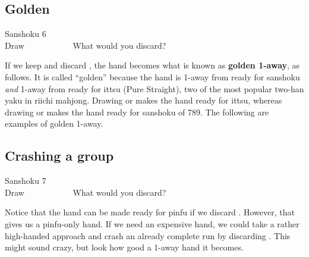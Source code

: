 \newpage
\subsection{Golden}\label{sec:san6}
\begin{itembox}[r]{{\jap Sanshoku} 6}
\bp
{}~\\
\hfill\footnotesize{Draw~~~~~~~~~~~}
\ep
\vspace{-17pt}What would you discard? \vspace{-5pt}
\end{itembox}
\noindent
If we keep {\LARGE{}} and discard {\LARGE{}}, the hand becomes what is known as {\bf golden 1-away}, as follows.
\bp
{}
\ep {}
It is called ``golden'' because the hand is 1-away from ready for {\jap sanshoku} \emph{and} 1-away from ready for {\jap ittsu} (Pure Straight), two of the most popular two-{\jap han yaku} in riichi mahjong.
Drawing {\LARGE{}} or {\LARGE{}} makes the hand ready for {\jap ittsu}, whereas drawing {\LARGE{}} or {\LARGE{}} makes the hand ready for {\jap sanshoku} of 789. The following are examples of golden 1-away.
\bp
{}\fa\fa\\
\ep

\newpage
\subsection{Crashing a group}\label{sec:san7}
\begin{itembox}[r]{{\jap Sanshoku} 7}
\bp
{}~\\
\hfill\footnotesize{Draw~~~~~~~~~~~}
\ep
\vspace{-15pt}What would you discard? \vspace{-5pt}
\end{itembox}
\noindent
Notice that the hand can be made ready for {\jap pinfu} if we discard {\LARGE{}}. However, that gives us a {\jap pinfu}-only hand. If we need an expensive hand, we could take a rather high-handed approach and crash an already complete run by discarding {\LARGE{}}. This might sound crazy, but look how good a 1-away hand it becomes.

